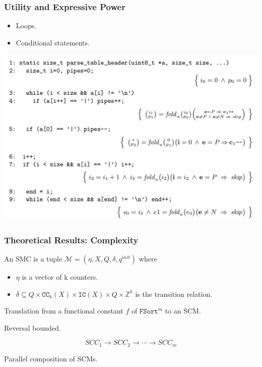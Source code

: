 \documentclass[11pt]{beamer}
\begin{document}
\begin{frame}\frametitle{Utility and Expressive Power}
\begin{itemize}
\item Loops.
\item Conditional statements.
\end{itemize}
\begin{center}
\includegraphics[scale=0.26]{mdafl.png}
\end{center}

\end{frame}

\begin{frame}\frametitle{Theoretical Results: Complexity}
\begin{definition}

An SMC is a tuple $\mathcal{M} = (\eta, X, Q, \delta, q^{init})$ where 
\begin{itemize}
\item $\eta$ is a vector of k counters.
\item $\delta \subseteq Q\times \texttt{CC}_k(X) \times \texttt{IC}(X)\times Q\times \mathbb{Z}^k$ is the transition relation.

\end{itemize}
\end{definition}
Translation from a functional constant $f$ of $\texttt{FSort}^m$ to an SCM.

Reversal bounded.

\[SCC_1 \rightarrow SCC_2 \rightarrow\cdots \rightarrow SCC_m\]

Parallel composition of SCMs.
\end{frame}
\end{document}
